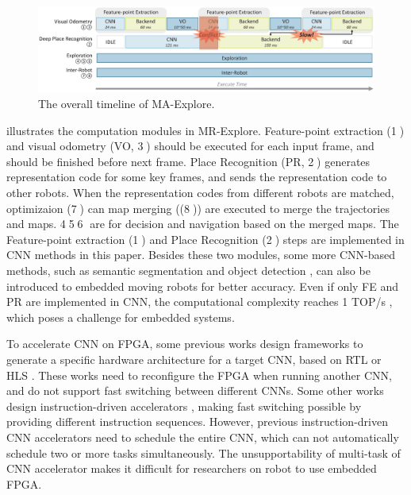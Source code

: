 \begin{figure}[t]
	\centering
	\includegraphics[width=0.89\linewidth]{fig/overalltime.eps}
    \caption{
    The overall timeline of MA-Explore.
    }
	\label{fig:overalltime}
\end{figure}

 illustrates the computation modules in MR-Explore. Feature-point extraction (\textcircled{1}) and visual odometry (VO, \textcircled{3}) should be executed for each input frame, and should be finished before next frame. 
Place Recognition (PR, \textcircled{2}) generates representation code for some key frames, and sends the representation code to other robots. 
When the  representation codes from different robots are matched, optimizaion (\textcircled{7}) can map merging ((\textcircled{8})) are executed to merge the trajectories and maps. \textcircled{4}\textcircled{5}\textcircled{6} are for decision and navigation based on the merged maps. 
The Feature-point extraction (\textcircled{1}) and  Place Recognition (\textcircled{2}) steps are implemented in CNN methods in this paper.
Besides these two modules, some more CNN-based methods, such as semantic segmentation \cite{long2015fully} and object detection \cite{ren2015faster}, can also be introduced to embedded moving robots for better accuracy.
Even if only FE and PR are implemented in CNN, the computational complexity reaches 1 TOP/s , which poses a challenge for embedded systems.

To accelerate CNN on FPGA, some previous works design frameworks to generate a specific hardware architecture for a target CNN, based on  RTL \cite{li_high_2016} or HLS \cite{lu_evaluating_2017}. These works need to reconfigure the FPGA when running another CNN, and do not support fast switching between different CNNs. Some other works design instruction-driven accelerators \cite{yu2018instruction,qiu2016going}, making fast switching possible by providing different instruction sequences. However, previous instruction-driven CNN accelerators need to schedule the entire CNN, which can not automatically schedule two or more tasks simultaneously. The unsupportability of multi-task of CNN accelerator makes it difficult for researchers on robot to use embedded FPGA.



